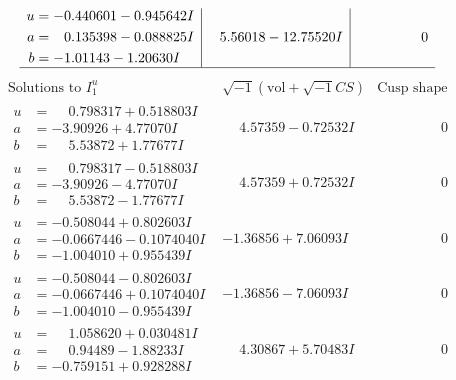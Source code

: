\documentclass[1p]{elsarticle_modified}
\theoremstyle{definition}
\newcommand{\I}{\sqrt{-1}}
\begin{document}
$$\begin{array}{c|c|c}
\begin{aligned}
u &= -0.440601 - 0.945642 I \\
a &= \phantom{-}0.135398 - 0.088825 I \\
b &= -1.01143 - 1.20630 I\end{aligned}
 & \phantom{-}5.56018 - 12.75520 I & \phantom{-0.000000 } 0\\
 \hline 
 \end{array}$$\newpage$$\begin{array}{c|c|c}  
\text{Solutions to }I^u_{1}& \I (\text{vol} + \sqrt{-1}CS) & \text{Cusp shape}\\
 \hline 
\begin{aligned}
u &= \phantom{-}0.798317 + 0.518803 I \\
a &= -3.90926 + 4.77070 I \\
b &= \phantom{-}5.53872 + 1.77677 I\end{aligned}
 & \phantom{-}4.57359 - 0.72532 I & \phantom{-0.000000 } 0 \\ \hline\begin{aligned}
u &= \phantom{-}0.798317 - 0.518803 I \\
a &= -3.90926 - 4.77070 I \\
b &= \phantom{-}5.53872 - 1.77677 I\end{aligned}
 & \phantom{-}4.57359 + 0.72532 I & \phantom{-0.000000 } 0 \\ \hline\begin{aligned}
u &= -0.508044 + 0.802603 I \\
a &= -0.0667446 - 0.1074040 I \\
b &= -1.004010 + 0.955439 I\end{aligned}
 & -1.36856 + 7.06093 I & \phantom{-0.000000 } 0 \\ \hline\begin{aligned}
u &= -0.508044 - 0.802603 I \\
a &= -0.0667446 + 0.1074040 I \\
b &= -1.004010 - 0.955439 I\end{aligned}
 & -1.36856 - 7.06093 I & \phantom{-0.000000 } 0 \\ \hline\begin{aligned}
u &= \phantom{-}1.058620 + 0.030481 I \\
a &= \phantom{-}0.94489 - 1.88233 I \\
b &= -0.759151 + 0.928288 I\end{aligned}
 & \phantom{-}4.30867 + 5.70483 I & \phantom{-0.000000 } 0 \\ \hline\begin{aligned}

\end{aligned}
\end{array}$$
\end{document}
